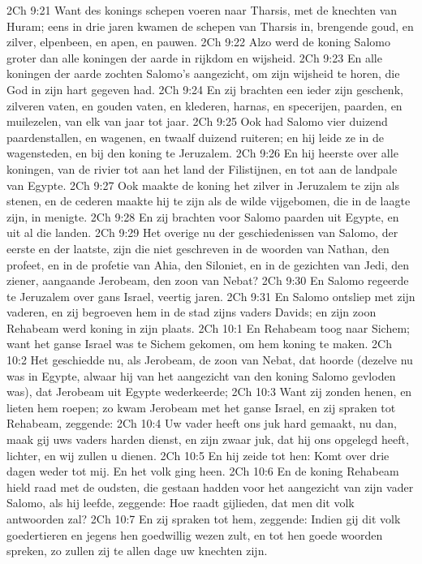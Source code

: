 2Ch 9:21  Want des konings schepen voeren naar Tharsis, met de knechten van Huram; eens in drie jaren kwamen de schepen van Tharsis in, brengende goud, en zilver, elpenbeen, en apen, en pauwen.
2Ch 9:22  Alzo werd de koning Salomo groter dan alle koningen der aarde in rijkdom en wijsheid.
2Ch 9:23  En alle koningen der aarde zochten Salomo's aangezicht, om zijn wijsheid te horen, die God in zijn hart gegeven had.
2Ch 9:24  En zij brachten een ieder zijn geschenk, zilveren vaten, en gouden vaten, en klederen, harnas, en specerijen, paarden, en muilezelen, van elk van jaar tot jaar.
2Ch 9:25  Ook had Salomo vier duizend paardenstallen, en wagenen, en twaalf duizend ruiteren; en hij leide ze in de wagensteden, en bij den koning te Jeruzalem.
2Ch 9:26  En hij heerste over alle koningen, van de rivier tot aan het land der Filistijnen, en tot aan de landpale van Egypte.
2Ch 9:27  Ook maakte de koning het zilver in Jeruzalem te zijn als stenen, en de cederen maakte hij te zijn als de wilde vijgebomen, die in de laagte zijn, in menigte.
2Ch 9:28  En zij brachten voor Salomo paarden uit Egypte, en uit al die landen.
2Ch 9:29  Het overige nu der geschiedenissen van Salomo, der eerste en der laatste, zijn die niet geschreven in de woorden van Nathan, den profeet, en in de profetie van Ahia, den Siloniet, en in de gezichten van Jedi, den ziener, aangaande Jerobeam, den zoon van Nebat?
2Ch 9:30  En Salomo regeerde te Jeruzalem over gans Israel, veertig jaren.
2Ch 9:31  En Salomo ontsliep met zijn vaderen, en zij begroeven hem in de stad zijns vaders Davids; en zijn zoon Rehabeam werd koning in zijn plaats.
2Ch 10:1  En Rehabeam toog naar Sichem; want het ganse Israel was te Sichem gekomen, om hem koning te maken.
2Ch 10:2  Het geschiedde nu, als Jerobeam, de zoon van Nebat, dat hoorde (dezelve nu was in Egypte, alwaar hij van het aangezicht van den koning Salomo gevloden was), dat Jerobeam uit Egypte wederkeerde;
2Ch 10:3  Want zij zonden henen, en lieten hem roepen; zo kwam Jerobeam met het ganse Israel, en zij spraken tot Rehabeam, zeggende:
2Ch 10:4  Uw vader heeft ons juk hard gemaakt, nu dan, maak gij uws vaders harden dienst, en zijn zwaar juk, dat hij ons opgelegd heeft, lichter, en wij zullen u dienen.
2Ch 10:5  En hij zeide tot hen: Komt over drie dagen weder tot mij. En het volk ging heen.
2Ch 10:6  En de koning Rehabeam hield raad met de oudsten, die gestaan hadden voor het aangezicht van zijn vader Salomo, als hij leefde, zeggende: Hoe raadt gijlieden, dat men dit volk antwoorden zal?
2Ch 10:7  En zij spraken tot hem, zeggende: Indien gij dit volk goedertieren en jegens hen goedwillig wezen zult, en tot hen goede woorden spreken, zo zullen zij te allen dage uw knechten zijn.
